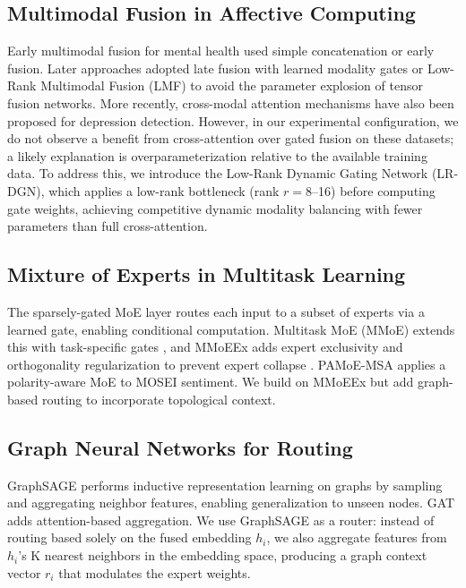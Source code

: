\documentclass[12pt,oneside]{book}
\begin{document}
\subsection{Multimodal Fusion in Affective Computing}

Early multimodal fusion for mental health used simple concatenation or early fusion. Later approaches adopted late fusion with learned modality gates or Low-Rank Multimodal Fusion (LMF) \citep{zadeh2017LMF} to avoid the parameter explosion of tensor fusion networks. More recently, cross-modal attention mechanisms have also been proposed for depression detection. However, in our experimental configuration, we do not observe a benefit from cross-attention over gated fusion on these datasets; a likely explanation is overparameterization relative to the available training data. To address this, we introduce the Low-Rank Dynamic Gating Network (LR-DGN), which applies a low-rank bottleneck (rank $r=8$--16) before computing gate weights, achieving competitive dynamic modality balancing with fewer parameters than full cross-attention.

\subsection{Mixture of Experts in Multitask Learning}

The sparsely-gated MoE layer \citep{shazeer2017moe} routes each input to a subset of experts via a learned gate, enabling conditional computation. Multitask MoE (MMoE) extends this with task-specific gates \citep{ma2018model}, and MMoEEx adds expert exclusivity and orthogonality regularization to prevent expert collapse \citep{jacobs2024mmoe}. PAMoE-MSA \citep{pamoe2025msa} applies a polarity-aware MoE to MOSEI sentiment. We build on MMoEEx but add graph-based routing to incorporate topological context.

\subsection{Graph Neural Networks for Routing}

GraphSAGE \citep{graphsage2017inductive} performs inductive representation learning on graphs by sampling and aggregating neighbor features, enabling generalization to unseen nodes. GAT \citep{gat2018attention} adds attention-based aggregation. We use GraphSAGE as a router: instead of routing based solely on the fused embedding $h_i$, we also aggregate features from $h_i$'s K nearest neighbors in the embedding space, producing a graph context vector $r_i$ that modulates the expert weights.
\end{document}
